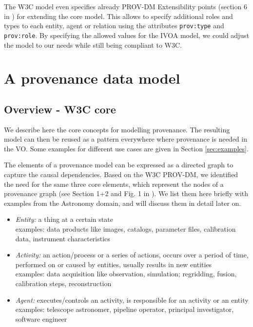 \documentclass[11pt,a4paper]{ivoa}
\begin{document}
The W3C model even specifies already PROV-DM Extensibility points (section 6 in \cite{std:W3CProvDM}) for extending the core model. This allows to specify additional roles and types to each entity, agent or relation using the attributes \texttt{prov:type} and \texttt{prov:role}.
By specifying the allowed values for the IVOA model, we could adjust the model to our needs while still being compliant to W3C.


\section{A provenance data model}
\subsection{Overview - W3C core}\label{sec:w3c_overview}
We describe here the core concepts for modelling provenance. The resulting model can then be reused as a pattern everywhere where provenance
is needed in the VO. Some examples for different use cases are given in Section \ref{sec:examples}.

The elements of a provenance model can be expressed as a directed graph to capture the causal dependencies. 
Based on the W3C PROV-DM, we identified the need for the same three core elements, which represent the nodes of a provenance graph
(see Section 1+2 and Fig. 1 in \cite{std:W3CProvDM}). We list them here briefly with examples from the Astronomy domain, and will discuss them in detail later on.

\begin{itemize}
\item \emph{Entity:} a thing at a certain state\\
    examples: data products like images, catalogs, parameter files, calibration data, instrument characteristics

\item \emph{Activity:} an action/process or a series of actions, occurs over a period of time, performed on or caused by entities, usually results in new entities\\
    examples: data acquisition like observation, simulation; regridding, fusion, calibration steps, reconstruction

\item \emph{Agent:} executes/controls an activity, is responsible for an activity or an entity\\
    examples: telescope astronomer, pipeline operator, principal investigator, software engineer

\end{itemize}
\end{document}
